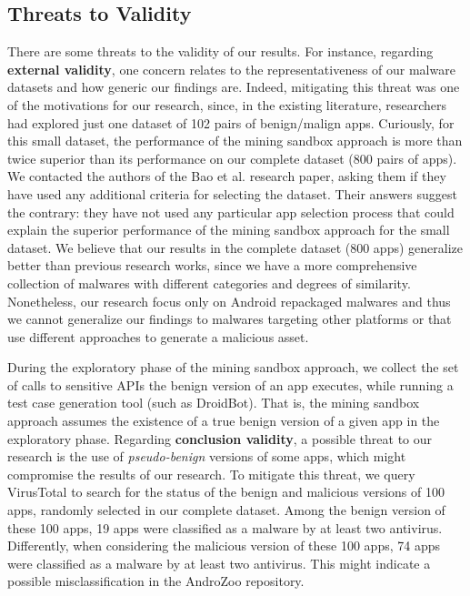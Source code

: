 \subsection{Threats to Validity}\label{sec:threats}


There are some threats to the validity of our results.
For instance, regarding {\bf external validity}, one concern relates to the 
representativeness of our malware datasets and how generic our findings are.
Indeed, mitigating this threat was one of the motivations for our research,
since, in the existing literature, researchers had explored just
one dataset of 102 pairs of benign/malign apps. Curiously,
for this small dataset, the performance of the
mining sandbox approach is more than twice superior
than its performance on our complete dataset (800 pairs of
apps). We contacted the authors of the Bao et al. research paper, asking them
if they have used any additional criteria for selecting the
dataset. Their answers suggest the contrary: they have not used
any particular app selection process that
could explain the superior performance of the mining
sandbox approach for the small dataset. We believe that
our results in the complete dataset (800 apps) generalize better than previous research works,
since we have a more comprehensive collection of malwares with different
categories and degrees of similarity. Nonetheless, our
research focus only on Android repackaged malwares and thus we
cannot generalize our findings to malwares targeting
other platforms or that use different approaches to
generate a malicious asset.

During the exploratory phase of the mining sandbox approach,
we collect the set of calls to sensitive APIs the benign version of
an app executes, while running a test case generation tool (such as
DroidBot). That is, the mining sandbox approach assumes the existence of a true benign
version of a given app in the exploratory phase. Regarding {\bf conclusion validity}, a
possible threat to our research is the use of \emph{pseudo-benign} versions
of some apps, which might compromise the results of our research.
To mitigate this threat, we query VirusTotal to search for the
status of the benign and malicious versions of 100 apps,
randomly selected in our complete dataset. Among the benign
version of these 100 apps, 19 apps were classified as a malware 
by at least two antivirus. Differently, when considering
the malicious version of these 100 apps, 74 apps were
classified as a malware by at least two antivirus. This might indicate
a possible misclassification in the AndroZoo repository.


